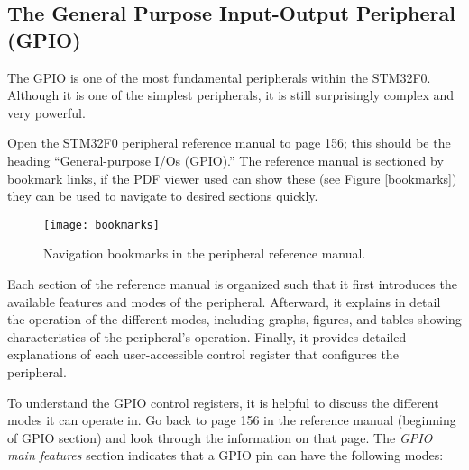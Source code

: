 \documentclass[11pt,fleqn]{book} %
\begin{document}
\subsection{The General Purpose Input-Output Peripheral (GPIO)}


The GPIO is one of the most fundamental peripherals within the STM32F0. Although it is one of the simplest peripherals, it is still surprisingly complex and very powerful.

Open the STM32F0 peripheral reference manual to page 156; this should be the heading ``General-purpose I/Os (GPIO).'' The reference manual is sectioned by bookmark links, if the PDF viewer used can show these (see Figure \vref{bookmarks}) they can be used to navigate to desired sections quickly.

\begin{figure}[]
    \centering\texttt{[image: bookmarks]}
    \caption{Navigation bookmarks in the peripheral reference manual.}
    \label{bookmarks}
\end{figure}

Each section of the reference manual is organized such that it first introduces the available features and modes of the peripheral. Afterward, it explains in detail the operation of the different modes,  including graphs, figures, and tables showing characteristics of the peripheral's operation. Finally, it provides detailed explanations of each user-accessible control register that configures the peripheral.

To understand the GPIO control registers, it is helpful to discuss the different modes it can operate in. Go back to page 156 in the reference manual (beginning of GPIO section) and look through the information on that page.
\newpage\noindent
The \textit{GPIO main features} section indicates that a GPIO pin can have the following modes:
\end{document}
